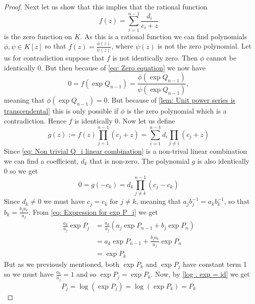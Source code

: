 \documentclass{article}
\numberwithin{equation}{section}
\begin{document}
\begin{proof}
	Next let us show that this implies that the rational function
	$$f(z) = \sum_{i=1}^{n-1}\frac{d_i}{c_i + z}$$
	is the zero function on $K$. As this is a rational function we can find polynomials $\phi, \psi \in K[z]$ so that $f(z) = \frac{\phi(z)}{\psi(z)}$, where $\psi(z)$ is not the zero polynomial. Let us for contradiction suppose that $f$ is not identically zero. Then $\phi$ cannot be identically 0. But then because of \cref{eq: Zero equation} we now have
	$$0 = f(\exp Q_{n-1}) = \frac{\phi(\exp Q_{n-1})}{\psi(\exp Q_{n-1})},$$
	meaning that $\phi(\exp Q_{n-1}) = 0$. But because of \cref{lem: Unit power series is transcendental} this is only possible if $\phi$ is the zero polynomial which is a contradiction. Hence $f$ is identically 0. Now let us define
	$$g(z) := f(z) \prod_{j=1}^{n-1}(c_j + z)  = \sum_{i = 1}^{n-1}d_i\prod_{j \neq i}(c_j + z)$$
	Since \cref{eq: Non trivial Q_i linear combination} is a non-trival linear combination we can find a coefficient, $d_k$ that is non-zero. The polynomial $g$ is also identically 0 so we get $$0 = g(-c_k) = d_k\prod_{j \neq k}^{n-1} (c_j - c_k)$$
	Since $d_k \neq 0$ we must have $c_j = c_k$ for $j \neq k$, meaning that $a_j b_j^{-1} = a_k b_k^{-1}$, so that $b_k = \frac{b_j a_k}{a_j}$. From \cref{eq: Expression for exp P_i} we get
	\begin{align*}
    	\frac{a_k}{a_j}\exp P_j & = \frac{a_k}{a_j}(a_j \exp P_{n-1} + b_j \exp P_n) \\
                            	& = a_k \exp P_{n-1} + \frac{b_j a_k}{a_j} \exp P_n  \\
                            	& = \exp P_k
	\end{align*}
	But as we previously mentioned, both $\exp P_k$ and $\exp P_j$ have constant term 1 so we must have $\frac{a_k}{a_j} = 1$ and so $\exp P_j = \exp P_k$. Now, by \cref{log . exp = id} we get
	$$P_j = \log(\exp P_j) = \log(\exp P_k) = P_k$$
\end{proof}
\end{document}
